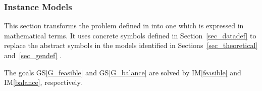 \documentclass[12pt]{article}
\newcommand{\gsref}[1]{GS\ref{#1}}
\newcommand{\iref}[1]{IM\ref{#1}}
\begin{document}
\subsubsection{Instance Models} \label{sec_instance}

This section transforms the problem defined in  into
one which is expressed in mathematical terms. It uses concrete symbols defined
in Section~\ref{sec_datadef} to replace the abstract symbols in the models
identified in Sections~\ref{sec_theoretical} and~\ref{sec_gendef} .

The goals \gsref{G_feasible} and \gsref{G_balance} are solved by \iref{feasible}
and \iref{balance}, respectively.

~\newline
\end{document}
